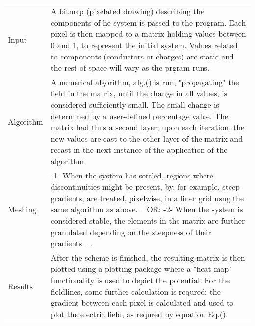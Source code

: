\documentclass{article}
\begin{document}
  \begin{tabular}{ l p{10cm} }
	Input		&	A bitmap (pixelated drawing) describing the components of he system is passed to the program. 
				 Each pixel is then mapped to a matrix holding values between 0 and 1, to represent the 
				  initial system. 
				 Values related to components (conductors or charges) are static and the rest of space will 
				  vary as the prgram runs.\\
	Algorithm	&	A numerical algorithm, alg.() is run, "propagating" the field in the matrix, until 
				  the change in all values, is considered sufficiently small. 
				 The small change is determined by a user-defined percentage value. 
				 The matrix had thus a second layer; upon each iteration, the new values are cast
				  to the other layer of the matrix and recast in the next instance of the application 
				  of the algorithm.\\
 	Meshing		&	-1- When the system has settled, regions where discontinuities might be present, by, for example,
	 			  steep gradients, are treated, pixelwise, in a finer grid usng the same algorithm as above. -- 
	 			  OR: 
				-2- When the system is considered stable, the elements in the matrix are further granulated 
				 depending on the steepness of their gradients. --. \\
	Results		&	After the scheme is finished, the resulting matrix is then plotted using a plotting 
				  package where a "heat-map" functionality is used to depict the potential. 
				 For the fieldlines, some further calculation is requred: the gradient between 
				  each pixel is calculated and used to plot the electric field, as requred by equation 
				  Eq.().
  \end{tabular}
\end{document}
